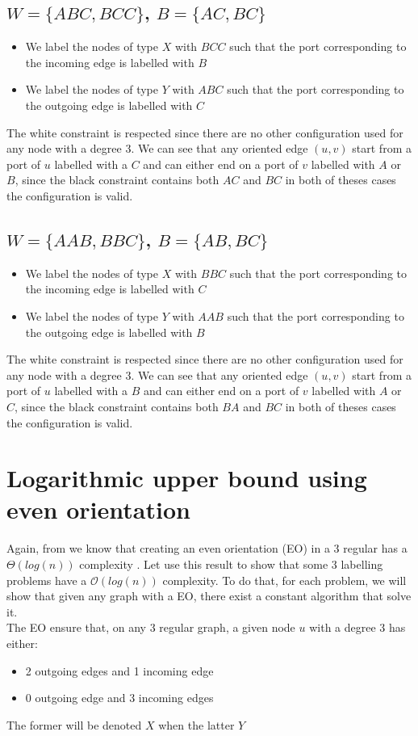 \subsection[(W = (ABC, BCC), B = (AC,BC)]{$W = \{ABC, BCC\}$, $B = \{AC, BC\}$}
\begin{itemize}
    \item We label the nodes of type $X$ with $BCC$ such that the port corresponding to the incoming edge is labelled with $B$
    \item We label the nodes of type $Y$ with $ABC$ such that the port corresponding to the outgoing edge is labelled with $C$
\end{itemize}
The white constraint is respected since there are no other configuration used for any node with a degree 3.
We can see that any oriented edge $(u,v)$ start from a port of $u$ labelled with a $C$ and can either end on a port of $v$ labelled with $A$ or $B$, since the black constraint contains both $AC$ and $BC$ in both of theses cases the configuration is valid.
\subsection[(W = (AAB, BBC), B = (AB,BC)]{$W = \{AAB, BBC\}$, $B = \{AB, BC\}$}


\begin{itemize}
    \item We label the nodes of type $X$ with $BBC$ such that the port corresponding to the incoming edge is labelled with $C$
    \item We label the nodes of type $Y$ with $AAB$ such that the port corresponding to the outgoing edge is labelled with $B$
\end{itemize}
The white constraint is respected since there are no other configuration used for any node with a degree 3.
We can see that any oriented edge $(u,v)$ start from a port of $u$ labelled with a $B$ and can either end on a port of $v$ labelled with $A$ or $C$, since the black constraint contains both $BA$ and $BC$ in both of theses cases the configuration is valid.



\section{Logarithmic upper bound using even orientation}
Again, from \cite{1} we know that creating an even orientation (EO) in a 3 regular has a $\Theta(log(n))$ complexity \cite{1}. Let use this result to show that some 3 labelling problems have a $\mathcal{O}(log(n))$ complexity. To do that, for each problem, we will show that given any graph with a EO, there exist a constant algorithm that solve it.\\
The EO ensure that, on any 3 regular graph, a given node $u$ with a degree 3 has either:
\begin{itemize}
    \item 2 outgoing edges and 1 incoming edge
    \item 0 outgoing edge and 3 incoming edges
\end{itemize}
The former will be denoted $X$ when the latter $Y$
